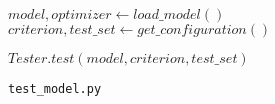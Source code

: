 \begin{algorithm}[htp]
    \footnotesize
    \SetAlgoLined

    \BlankLine
    \BlankLine
    \BlankLine

    $model, optimizer \gets load\_model()$\\
    $criterion, test\_set \gets get\_configuration()$\BlankLine\BlankLine

    $Tester.test(model, criterion, test\_set)$

    \caption{\texttt{test\_model.py}}
    \label{alg:testmodel}
\end{algorithm}